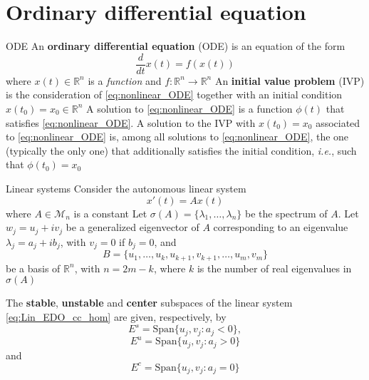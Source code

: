 \documentclass{beamer}
\def\IR{\mathbb{R}}
\def\M{\mathcal{M}}
\def\ie{\emph{i.e.}}
\def\defword#1{\textbf{#1}}
\begin{document}
\section{Ordinary differential equation}

\begin{frame}{ODE}
An \defword{ordinary differential equation} (ODE) is an equation of the form 
\begin{equation}\label{eq:nonlinear_ODE}
\dfrac{d}{dt}x(t)= f(x(t))
\end{equation}
where $x(t)\in \IR^n$ is a \emph{function} and $f:\IR^n \to \IR^n$
\vfill
An \defword{initial value problem} (IVP) is the consideration of \eqref{eq:nonlinear_ODE} together with an initial condition $x(t_0)=x_0\in\IR^n$
\vfill
A solution to \eqref{eq:nonlinear_ODE} is a function $\phi(t)$ that satisfies \eqref{eq:nonlinear_ODE}. A solution to the IVP with $x(t_0)=x_0$ associated to \eqref{eq:nonlinear_ODE} is, among all solutions to \eqref{eq:nonlinear_ODE}, the one (typically the only one) that additionally satisfies the initial condition, \ie, such that $\phi(t_0)=x_0$
\end{frame}

\begin{frame}{Linear systems}
Consider the autonomous linear system
\begin{equation}\label{eq:Lin_EDO_cc_hom}
x'(t)=Ax(t)
\end{equation}
where $A\in\M_n$ is a constant
\vfill
Let $\sigma(A)=\{\lambda_1,\ldots,\lambda_n\}$ be the spectrum of $A$.
Let $w_j=u_j+iv_j$ be a generalized eigenvector of $A$ corresponding to an eigenvalue $\lambda_j=a_j+ib_j$, with $v_j=0$ if $b_j=0$, and 
\[
B=\{u_1,\ldots,u_k,u_{k+1},v_{k+1},\ldots,u_m,v_m\}
\]
be a basis of $\mathbb{R}^n$, with $n=2m-k$, where $k$ is the number of real eigenvalues in $\sigma(A)$
\end{frame}

\begin{frame}
\begin{definition}
The \defword{stable}, \defword{unstable} and \defword{center} subspaces of the linear system \eqref{eq:Lin_EDO_cc_hom} are given, respectively, by
\[
E^s=\textrm{Span}\{u_j,v_j:a_j<0\},
\]
\[
E^u=\textrm{Span}\{u_j,v_j:a_j>0\}
\]
and
\[
E^c=\textrm{Span}\{u_j,v_j:a_j=0\}
\]
\end{definition}
\end{frame}
\end{document}
